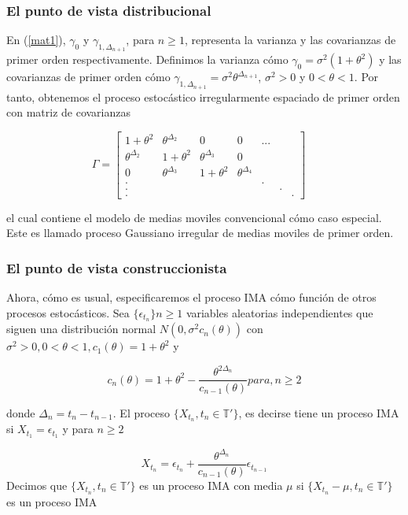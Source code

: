 \subsubsection{El punto de vista distribucional}
En (\ref{mat1}), $\gamma_0$ y $\gamma_{1,\Delta_{n+1}}$, para $n\geq1$, representa la varianza y las covarianzas 
de primer orden respectivamente. Definimos la varianza cómo $\gamma_0=\sigma^2(1+\theta^2)$ y las covarianzas de 
primer orden cómo $\gamma_{1,\Delta_{n+1}}=\sigma^2 \theta^{\Delta_{n+1}}$, $\sigma^2 >0$ y $0<\theta <1$. 
Por tanto, obtenemos el proceso estocástico irregularmente espaciado de primer orden con matriz de covarianzas

\begin{equation}
    \Gamma=
	\begin{bmatrix} 
	1+\theta^2 & \theta^{\Delta_2} & 0 & 0 & ... \\
	\theta^{\Delta_2} & 1+\theta^2 & \theta^{\Delta_3}& 0\\
	0 & \theta^{\Delta_3} & 1+\theta^2 & \theta^{\Delta_4} \\
	.& & & & . \\
	.& & & & & .\\
	. & & & & & & .
	\end{bmatrix}
	\quad
	\label{mat2}
\end{equation}

el cual contiene el modelo de medias moviles convencional cómo caso especial. Este es llamado proceso Gaussiano 
irregular de medias moviles de primer orden.

\subsubsection{El punto de vista construccionista}

Ahora, cómo es usual, especificaremos el proceso IMA cómo función de otros procesos estocásticos. 
Sea $\lbrace \epsilon_{t_n}\rbrace n\geq 1$ variables aleatorias independientes que siguen una distribución 
normal $N(0,\sigma^2 c_n(\theta))$ con $\sigma^2 >0, 0<\theta<1, c_1(\theta)=1+\theta^2$ y

$$
c_n(\theta)=1+\theta^2-\frac{\theta^{2\Delta_n}}{c_{n-1}(\theta)} para, n\geq 2
$$

donde $\Delta_n=t_n-t_{n-1}$. El proceso $\lbrace X_{t_n},t_n \in \mathbb{T'} \rbrace$, es decirse tiene un proceso 
IMA si $X_{t_1}=\epsilon_{t_1}$ y para $n\geq 2 $

\begin{equation}
    X_{t_n}= \epsilon_{t_n}+\frac{\theta^{\Delta_n}}{c_{n-1}(\theta)}\epsilon_{t_{n-1}}
\end{equation}
Decimos que $\lbrace X_{t_n},t_n \in \mathbb{T'} \rbrace$ es un proceso IMA con media 
$\mu$ si $\lbrace X_{t_n}-\mu,t_n \in \mathbb{T'} \rbrace$ es un proceso IMA

